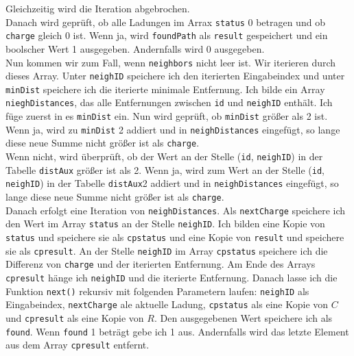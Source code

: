\documentclass[a4paper,10pt,ngerman]{scrartcl}
\begin{document}
Gleichzeitig wird die Iteration abgebrochen.\\
Danach wird geprüft, ob alle Ladungen im Arrax \texttt{status} 0 betragen und ob \texttt{charge} gleich 0 ist.
Wenn ja, wird \texttt{foundPath} als \texttt{result} gespeichert und ein boolscher Wert 1 ausgegeben. Andernfalls wird 0 ausgegeben.\\
Nun kommen wir zum Fall, wenn \texttt{neighbors} nicht leer ist. Wir iterieren durch dieses Array.
Unter \texttt{neighID} speichere ich den iterierten Eingabeindex und unter \texttt{minDist} speichere ich die iterierte minimale Entfernung.
Ich bilde ein Array \texttt{nieghDistances}, das alle Entfernungen zwischen \texttt{id} und \texttt{neighID} enthält.
Ich füge zuerst in es \texttt{minDist} ein. Nun wird geprüft, ob \texttt{minDist} größer als 2 ist.
Wenn ja, wird zu \texttt{minDist} 2 addiert und in \texttt{neighDistances} eingefügt,
so lange diese neue Summe nicht größer ist als \texttt{charge}.\\
Wenn nicht, wird überprüft, ob der Wert an der Stelle (\texttt{id}, \texttt{neighID}) in der Tabelle \texttt{distAux} größer ist
als 2. Wenn ja, wird zum Wert an der Stelle (\texttt{id}, \texttt{neighID}) in der Tabelle \texttt{distAux}2 addiert
und in \texttt{neighDistances} eingefügt, so lange diese neue Summe nicht größer ist als \texttt{charge}.\\
Danach erfolgt eine Iteration von \texttt{neighDistances}. Als \texttt{nextCharge} speichere ich den Wert im Array \texttt{status}
an der Stelle \texttt{neighID}. Ich bilden eine Kopie von \texttt{status} und speichere sie als \texttt{cpstatus} und
eine Kopie von \texttt{result} und speichere sie als \texttt{cpresult}. An der Stelle \texttt{neighID} im Array \texttt{cpstatus}
speichere ich die Differenz von \texttt{charge} und der iterierten Entfernung. Am Ende des Arrays \texttt{cpresult} hänge ich
\texttt{neighID} und die iterierte Entfernung.
Danach lasse ich die Funktion \texttt{next()} rekursiv mit folgenden Parametern laufen: \texttt{neighID} als Eingabeindex,
\texttt{nextCharge} ale aktuelle Ladung, \texttt{cpstatus} als eine Kopie von $C$ und \texttt{cpresult} als eine Kopie von $R$.
Den ausgegebenen Wert speichere ich als \texttt{found}. Wenn \texttt{found} 1 beträgt gebe ich 1 aus.
Andernfalls wird das letzte Element aus dem Array \texttt{cpresult} entfernt.\\
\end{document}
